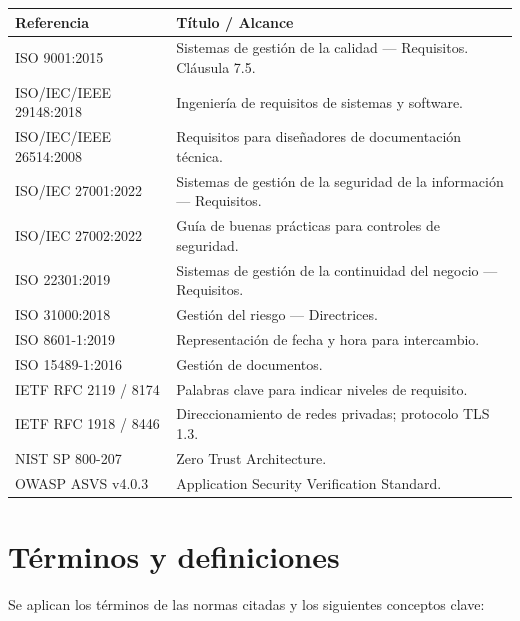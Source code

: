 \documentclass[10pt,a4paper]{article}
\begin{document}
\begin{table}[htbp]
\centering
\small
\begin{tabular}{|p{5.5cm}|p{10.5cm}|}
\hline
\textbf{\textsf{Referencia}} & \textbf{\textsf{Título / Alcance}} \\
\hline
ISO 9001:2015 & Sistemas de gestión de la calidad — Requisitos. Cláusula 7.5. \\
\hline
ISO/IEC/IEEE 29148:2018 & Ingeniería de requisitos de sistemas y software. \\
\hline
ISO/IEC/IEEE 26514:2008 & Requisitos para diseñadores de documentación técnica. \\
\hline
ISO/IEC 27001:2022 & Sistemas de gestión de la seguridad de la información — Requisitos. \\
\hline
ISO/IEC 27002:2022 & Guía de buenas prácticas para controles de seguridad. \\
\hline
ISO 22301:2019 & Sistemas de gestión de la continuidad del negocio — Requisitos. \\
\hline
ISO 31000:2018 & Gestión del riesgo — Directrices. \\
\hline
ISO 8601-1:2019 & Representación de fecha y hora para intercambio. \\
\hline
ISO 15489-1:2016 & Gestión de documentos. \\
\hline
IETF RFC 2119 / 8174 & Palabras clave para indicar niveles de requisito. \\
\hline
IETF RFC 1918 / 8446 & Direccionamiento de redes privadas; protocolo TLS 1.3. \\
\hline
NIST SP 800-207 & Zero Trust Architecture. \\
\hline
OWASP ASVS v4.0.3 & Application Security Verification Standard. \\
\hline
\end{tabular}
\end{table}

\section{Términos y definiciones}
Se aplican los términos de las normas citadas y los siguientes conceptos clave:
\end{document}
